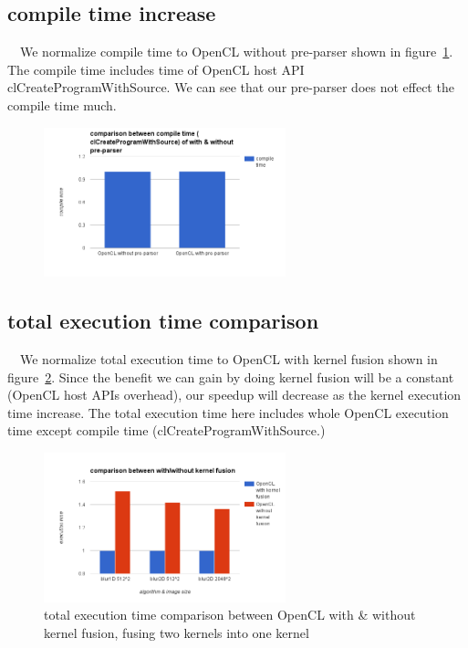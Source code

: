 \documentclass{sigplanconf}
\begin{document}
\subsection{compile time increase}
\quad\ \ We normalize compile time to OpenCL without pre-parser shown in figure~\ref{fig:my_label_ex_1}. The compile time includes time of OpenCL host API clCreateProgramWithSource. We can see that our pre-parser does not effect the compile time much.

\begin{figure}[hbtp]
\centering
\includegraphics[width=7cm]{img/compile-time.png}
\caption{}
\label{fig:my_label_ex_1}
\end{figure}

\subsection{total execution time comparison}
\quad\ \ We normalize total execution time to OpenCL with kernel fusion shown in figure~\ref{fig:my_label_ex_2}. Since the benefit we can gain by doing kernel fusion will be a constant (OpenCL host APIs overhead), our speedup will decrease as the kernel execution time increase. The total execution time here includes whole OpenCL execution time except compile time (clCreateProgramWithSource.)
    
\begin{figure}[hbtp]
\centering
\includegraphics[width=7cm]{img/with-without-2ker.png}
\caption{total execution time comparison between OpenCL with \& without kernel fusion, fusing two kernels into one kernel}
\label{fig:my_label_ex_2}
\end{figure}
\end{document}
